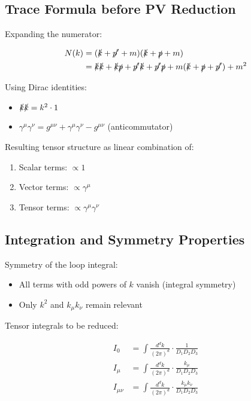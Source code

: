 \documentclass[12pt,a4paper]{article}
\theoremstyle{definition}
\begin{document}
	\subsection{Trace Formula before PV Reduction}
	
	Expanding the numerator:
	
	\begin{align}
		N(k) &= (\slashed{k} + \slashed{p'} + m)(\slashed{k} + \slashed{p} + m)\\
		&= \slashed{k}\slashed{k} + \slashed{k}\slashed{p} + \slashed{p'}\slashed{k} + \slashed{p'}\slashed{p} + m(\slashed{k} + \slashed{p} + \slashed{p'}) + m^2
	\end{align}
	
	Using Dirac identities:
	\begin{itemize}
		\item $\slashed{k}\slashed{k} = k^2 \cdot 1$
		\item $\gamma^\mu\gamma^\nu = g^{\mu\nu} + \gamma^\mu\gamma^\nu - g^{\mu\nu}$ (anticommutator)
	\end{itemize}
	
	Resulting tensor structure as linear combination of:
	\begin{enumerate}
		\item Scalar terms: $\propto 1$
		\item Vector terms: $\propto \gamma^\mu$  
		\item Tensor terms: $\propto \gamma^\mu\gamma^\nu$
	\end{enumerate}
	
	\subsection{Integration and Symmetry Properties}
	
	Symmetry of the loop integral:
	\begin{itemize}
		\item All terms with odd powers of $k$ vanish (integral symmetry)
		\item Only $k^2$ and $k_\mu k_\nu$ remain relevant
	\end{itemize}
	
	Tensor integrals to be reduced:
	
	\begin{align}
		I_0 &= \int \frac{d^d k}{(2\pi)^d} \cdot \frac{1}{D_1 D_2 D_3}\\
		I_\mu &= \int \frac{d^d k}{(2\pi)^d} \cdot \frac{k_\mu}{D_1 D_2 D_3}\\
		I_{\mu\nu} &= \int \frac{d^d k}{(2\pi)^d} \cdot \frac{k_\mu k_\nu}{D_1 D_2 D_3}
	\end{align}
	
\end{document}
